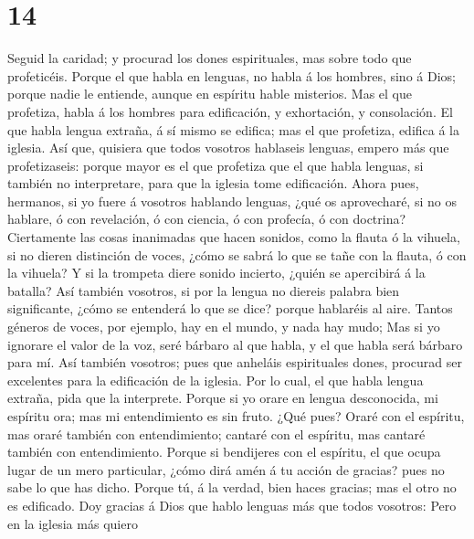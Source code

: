 \hypertarget{section-13}{%
\section{14}\label{section-13}}

 Seguid la caridad; y procurad los dones espirituales, mas
sobre todo que profeticéis.  Porque el que habla en
lenguas, no habla á los hombres, sino á Dios; porque nadie le entiende,
aunque en espíritu hable misterios.  Mas el que profetiza,
habla á los hombres para edificación, y exhortación, y consolación.
 El que habla lengua extraña, á sí mismo se edifica; mas
el que profetiza, edifica á la iglesia.  Así que, quisiera
que todos vosotros hablaseis lenguas, empero más que profetizaseis:
porque mayor es el que profetiza que el que habla lenguas, si también no
interpretare, para que la iglesia tome edificación.  Ahora
pues, hermanos, si yo fuere á vosotros hablando lenguas, ¿qué os
aprovecharé, si no os hablare, ó con revelación, ó con ciencia, ó con
profecía, ó con doctrina?  Ciertamente las cosas
inanimadas que hacen sonidos, como la flauta ó la vihuela, si no dieren
distinción de voces, ¿cómo se sabrá lo que se tañe con la flauta, ó con
la vihuela?  Y si la trompeta diere sonido incierto,
¿quién se apercibirá á la batalla?  Así también vosotros,
si por la lengua no diereis palabra bien significante, ¿cómo se
entenderá lo que se dice? porque hablaréis al aire. 
Tantos géneros de voces, por ejemplo, hay en el mundo, y nada hay mudo;
 Mas si yo ignorare el valor de la voz, seré bárbaro al
que habla, y el que habla será bárbaro para mí.  Así
también vosotros; pues que anheláis espirituales dones, procurad ser
excelentes para la edificación de la iglesia.  Por lo
cual, el que habla lengua extraña, pida que la interprete.
 Porque si yo orare en lengua desconocida, mi espíritu
ora; mas mi entendimiento es sin fruto.  ¿Qué pues? Oraré
con el espíritu, mas oraré también con entendimiento; cantaré con el
espíritu, mas cantaré también con entendimiento.  Porque
si bendijeres con el espíritu, el que ocupa lugar de un mero particular,
¿cómo dirá amén á tu acción de gracias? pues no sabe lo que has dicho.
 Porque tú, á la verdad, bien haces gracias; mas el otro
no es edificado.  Doy gracias á Dios que hablo lenguas
más que todos vosotros:  Pero en la iglesia más quiero
